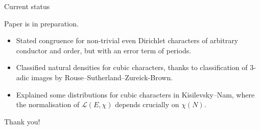 \documentclass[10pt]{beamer}
\begin{document}
\begin{frame}{Current status}

Paper is in preparation.
\begin{itemize}
\item Stated congruence for non-trivial even Dirichlet characters of arbitrary conductor and order, but with an error term of periods.
\item Classified natural densities for cubic characters, thanks to classification of $ 3 $-adic images by Rouse--Sutherland--Zureick-Brown.
\item Explained some distributions for cubic characters in Kisilevsky--Nam, where the normalisation of $ \mathcal{L}(E, \chi) $ depends crucially on $ \chi(N) $.
\end{itemize}
Thank you!

\end{frame}
\end{document}
